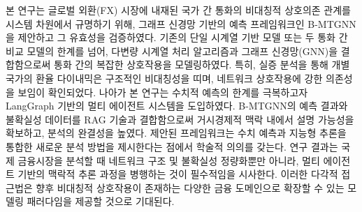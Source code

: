 \titlespacing*{\subsection}{0pt}{1.0em}{0.3em}
\titlespacing*{\paragraph}{0pt}{1.0em}{0.3em}

본 연구는 글로벌 외환(FX) 시장에 내재된 국가 간 통화의 비대칭적 상호의존 관계를 시스템 차원에서 규명하기 위해, 그래프 신경망 기반의 예측 프레임워크인 B-MTGNN을 제안하고 그 유효성을 검증하였다. 기존의 단일 시계열 기반 모델 또는 두 통화 간 비교 모델의 한계를 넘어, 다변량 시계열 처리 알고리즘과 그래프 신경망(GNN)을 결합함으로써 통화 간의 복잡한 상호작용을 모델링하였다. 특히, 실증 분석을 통해 개별 국가의 환율 다이내믹은 구조적인 비대칭성을 띠며, 네트워크 상호작용에 강한 의존성을 보임이 확인되었다. 나아가 본 연구는 수치적 예측의 한계를 극복하고자 LangGraph 기반의 멀티 에이전트 시스템을 도입하였다. B-MTGNN의 예측 결과와 불확실성 데이터를 RAG 기술과 결합함으로써 거시경제적 맥락 내에서 설명 가능성을 확보하고, 분석의 완결성을 높였다.
제안된 프레임워크는 수치 예측과 지능형 추론을 통합한 새로운 분석 방법을 제시한다는 점에서 학술적 의의를 갖는다. 연구 결과는 국제 금융시장을 분석할 때 네트워크 구조 및 불확실성 정량화뿐만 아니라, 멀티 에이전트 기반의 맥락적 추론 과정을 병행하는 것이 필수적임을 시사한다. 이러한 다각적 접근법은 향후 비대칭적 상호작용이 존재하는 다양한 금융 도메인으로 확장할 수 있는 모델링 패러다임을 제공할 것으로 기대된다.
